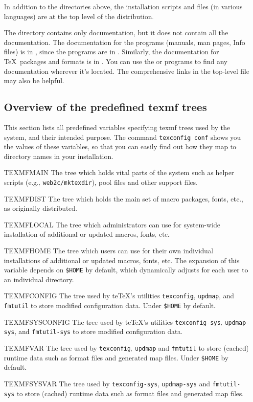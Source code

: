 \documentclass{article}
\begin{document}
In addition to the directories above, the installation scripts and
 files (in various languages) are at the top level of
the distribution.

The  directory contains only documentation, but
it does not contain all the documentation.  The documentation for the
programs (manuals, man pages, Info files) is in ,
since the programs are in .  Similarly, the documentation
for \TeX\ packages and formats is in .  You can
use the  or  programs to find any
documentation wherever it's located.  The comprehensive links in the
top-level file  may also be helpful.


\subsection{Overview of the predefined texmf trees}
\label{sec:texmftrees}

This section lists all predefined variables specifying texmf trees used
by the system, and their intended purpose. The command \texttt{texconfig
conf} shows you the values of these variables, so that you can easily
find out how they map to directory names in your installation.

\begin{ttdescription}
\item [TEXMFMAIN] The tree which holds vital parts of the system 
  such as helper scripts (e.g., \verb+web2c/mktexdir+), pool files and
  other support files.
\item [TEXMFDIST] The tree which holds the main set of macro packages,
  fonts, etc., as originally distributed. 
\item [TEXMFLOCAL] The tree which administrators can use for system-wide
  installation of additional or updated macros, fonts, etc.
\item [TEXMFHOME] The tree which users can use for their own individual
  installations of additional or updated macros, fonts, etc.
  The expansion of this variable depends on \verb+$HOME+ by default, %
  which dynamically adjusts for each user to an individual
  directory. 
\item [TEXMFCONFIG] The tree used by te\TeX's utilities
  \verb+texconfig+, \verb+updmap+, and \verb+fmtutil+ to store modified
  configuration data.  Under \verb+$HOME+ by default. %
\item [TEXMFSYSCONFIG] The tree used by te\TeX's utilities
  \verb+texconfig-sys+, \verb+updmap-sys+, and \verb+fmtutil-sys+ to
  store modified configuration data.
\item [TEXMFVAR] The tree used by \verb+texconfig+, \verb+updmap+ and
  \verb+fmtutil+ to store (cached) runtime data such as format files and
  generated map files.  Under \verb+$HOME+ by default. %
\item [TEXMFSYSVAR] The tree used by \verb+texconfig-sys+,
  \verb+updmap-sys+ and \verb+fmtutil-sys+ to store (cached) runtime
  data such as format files and generated map files.
\end{ttdescription}
\end{document}
